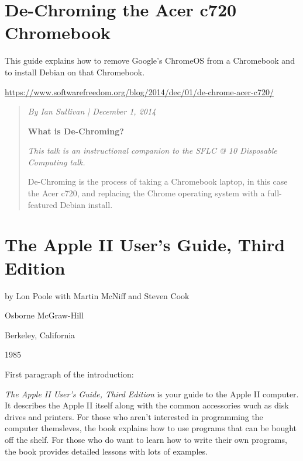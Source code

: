 \documentclass[a4paper,12pt]{article}
\begin{document}
\section{De-Chroming the Acer c720 Chromebook}
This guide explains how to remove Google's ChromeOS from a Chromebook and to install Debian on that Chromebook.
\begin{flushleft}
\url{https://www.softwarefreedom.org/blog/2014/dec/01/de-chrome-acer-c720/}
\end{flushleft}
\begin{quotation}
\textit{By Ian Sullivan | December 1, 2014}

\textbf{What is De-Chroming?}

\textit{This talk is an instructional companion to the SFLC @ 10 Disposable Computing talk.}

De-Chroming is the process of taking a Chromebook laptop, in this case the Acer c720, and replacing the Chrome operating system with a full-featured Debian install.
\end{quotation}

\section{The Apple II User's Guide, Third Edition}
\linebreak
\begin{flushleft}
by Lon Poole with Martin McNiff and Steven Cook\par
Osborne McGraw-Hill\par
Berkeley, California\par
1985\par
\end{flushleft}
\linebreak
\begin{flushleft}
First paragraph of the introduction:
\end{flushleft}
\linebreak
\begin{displayquote}
\textit{The Apple II User's Guide, Third Edition} is your guide to the Apple II computer. It describes the Apple II itself along with the common accessories wuch as disk drives and printers. For those who aren't interested in programming the computer themsleves, the book explains how to use programs that can be bought off the shelf. For those who do want to learn how to write their own programs, the book provides detailed lessons with lots of examples.
\end{displayquote}
\linebreak
\end{document}
